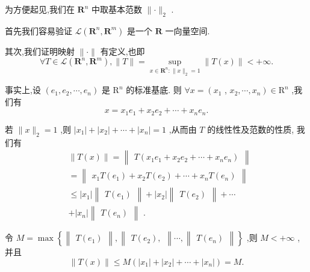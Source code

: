 为方便起见,我们在 ${\mathbf{R}}^{n}$ 中取基本范数 $\parallel  \cdot  {\parallel }_{2}$ .

首先我们容易验证 $\mathcal{L}\left( {{\mathbf{R}}^{n},{\mathbf{R}}^{m}}\right)$ 是一个 $\mathbf{R}$ 一向量空间.

其次,我们证明映射 $\parallel  \cdot  \parallel$ 有定义,也即
$$\forall T \in  \mathcal{L}\left( {{\mathbf{R}}^{n},{\mathbf{R}}^{m}}\right) ,\parallel T\parallel  = \mathop{\sup }\limits_{{x \in  {\mathbf{R}}^{n} : \parallel x{\parallel }_{2} = 1}}\parallel T\left( x\right) \parallel  <  + \infty .$$

事实上,设 $\left( {{e}_{1},{e}_{2},\cdots ,{e}_{n}}\right)$ 是 ${\mathrm{R}}^{n}$ 的标准基底. 则 $\forall x = \left( {x}_{1}\right.$ , $\left. {{x}_{2},\cdots ,{x}_{n}}\right)  \in  {\mathrm{R}}^{n}$ ,我们有
$$x = {x}_{1}{e}_{1} + {x}_{2}{e}_{2} + \cdots  + {x}_{n}{e}_{n}.$$

若 $\parallel x{\parallel }_{2} = 1$ ,则 $\left| {x}_{1}\right|  + \left| {x}_{2}\right|  + \cdots  + \left| {x}_{n}\right|  = 1$ ,从而由 $T$ 的线性性及范数的性质, 我们有
\begin{align*}
	&\parallel T\left( x\right) \parallel  = \begin{Vmatrix}{T\left( {{x}_{1}{e}_{1} + {x}_{2}{e}_{2} + \cdots  + {x}_{n}{e}_{n}}\right) }\end{Vmatrix}\\
	&= \begin{Vmatrix}{{x}_{1}T\left( {e}_{1}\right)  + {x}_{2}T\left( {e}_{2}\right)  + \cdots  + {x}_{n}T\left( {e}_{n}\right) }\end{Vmatrix}\\
	&\leq  \left| {x}_{1}\right| \begin{Vmatrix}{T\left( {e}_{1}\right) }\end{Vmatrix} + \left| {x}_{2}\right| \begin{Vmatrix}{T\left( {e}_{2}\right) }\end{Vmatrix} + \cdots\\
	&+ \left| {x}_{n}\right| \begin{Vmatrix}{T\left( {e}_{n}\right) }\end{Vmatrix}\text{ . }
\end{align*}

令 $M = \max \left\{  {\begin{Vmatrix}{T\left( {e}_{1}\right) }\end{Vmatrix},\begin{Vmatrix}{T\left( {e}_{2}\right) ,}\end{Vmatrix}\cdots ,\begin{Vmatrix}{T\left( {e}_{n}\right) }\end{Vmatrix}}\right\}$ ,则 $M <  + \infty$ , 并且
$$\parallel T\left( x\right) \parallel  \leq  M\left( {\left| {x}_{1}\right|  + \left| {x}_{2}\right|  + \cdots  + \left| {x}_{n}\right| }\right)  = M.$$

